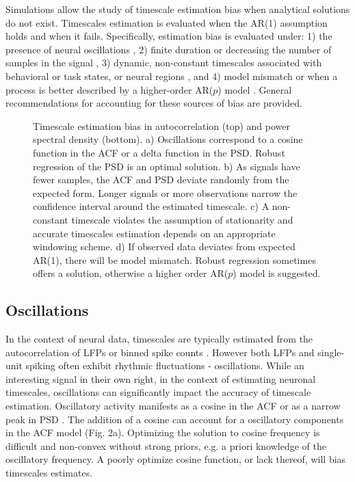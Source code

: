 \documentclass[pdflatex,sn-mathphys-num]{sn-jnl}
\begin{document}
Simulations allow the study of timescale estimation bias when analytical solutions do not exist. Timescales estimation is evaluated when the AR(1) assumption holds and when it fails. Specifically, estimation bias is evaluated under: 1) the presence of neural oscillations \cite{berger_uber_1929, buzsaki_neuronal_2004}, 2) finite duration or decreasing the number of samples in the signal \cite{broersen_finite_2000, schwarz_estimating_1978, zeraati_flexible_2022}, 3) dynamic, non-constant timescales associated with behavioral or task states, or neural regions \cite{gao_neuronal_2020, spitmaan_multiple_2020}, and 4) model mismatch or when a process is better described by a higher-order AR($p$) model \cite{broersen_finite_2000}. General recommendations for accounting for these sources of bias are provided. 

\begin{figure}[htbp]
  \centering
  
  \caption{Timescale estimation bias in autocorrelation (top) and power spectral density (bottom). a) Oscillations correspond to a cosine function in the ACF or a delta function in the PSD. Robust regression of the PSD is an optimal solution. b) As signals have fewer samples, the ACF and PSD deviate randomly from the expected form. Longer signals or more observations narrow the confidence interval around the estimated timescale. c) A non-constant timescale violates the assumption of stationarity and accurate timescales estimation depends on an appropriate windowing scheme. d) If observed data deviates from expected AR(1), there will be model mismatch. Robust regression sometimes offers a solution, otherwise a higher order AR($p$) model is suggested.}
\end{figure}

\subsection{Oscillations}

In the context of neural data, timescales are typically estimated from the autocorrelation of LFPs or binned spike counts \cite{murray_hierarchy_2014}. However both LFPs and single-unit spiking often exhibit rhythmic fluctuations - oscillations. While an interesting signal in their own right, in the context of estimating neuronal timescales, oscillations can significantly impact the accuracy of timescale estimation. Oscillatory activity manifests as a cosine in the ACF \cite{brunel_fast_1999} or as a narrow peak in PSD \cite{he_scale-free_2014, buzsaki_scaling_2013}. The addition of a cosine can account for a oscillatory components in the ACF model (Fig. 2a). Optimizing the solution to cosine frequency is difficult and non-convex without strong priors, e.g. a priori knowledge of the oscillatory frequency. A poorly optimize cosine function, or lack thereof, will bias timescales estimates.
\end{document}
